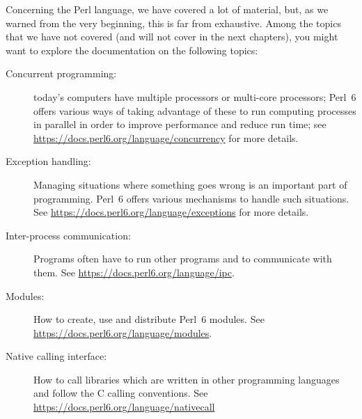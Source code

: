 Concerning the Perl language, we have covered a lot of 
material, but, as we warned from the very beginning, 
this is far from exhaustive. Among the topics that 
we have not covered (and will not cover in the next 
chapters), you might want to explore the documentation 
on the following topics:

\begin{description}
\item[Concurrent programming:] today's computers have 
multiple processors or multi-core processors; Perl~6 
offers various ways of taking advantage of these to 
run computing processes in parallel in order to 
improve performance and reduce run time; see 
\url{https://docs.perl6.org/language/concurrency} 
for more details.

\item[Exception handling:] Managing situations where 
something goes wrong is an important part of 
programming. Perl~6 offers various mechanisms to 
handle such situations. See \url{https://docs.perl6.org/language/exceptions} 
for more details.

\item[Inter-process communication:] Programs often have to 
run other programs and to communicate with them. See 
\url{https://docs.perl6.org/language/ipc}.

\item[Modules:] How to create, use and distribute Perl~6 
modules. See \url{https://docs.perl6.org/language/modules}.

\item[Native calling interface:] How to call libraries 
which are written in other programming languages and 
follow the C calling conventions. 
See \url{https://docs.perl6.org/language/nativecall}

\end{description}